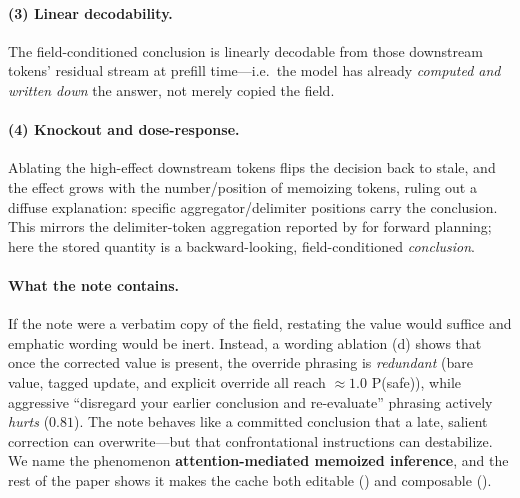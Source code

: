\paragraph{(3) Linear decodability.} The field-conditioned conclusion is linearly decodable from those
downstream tokens' residual stream at prefill time---i.e.\ the model has already \emph{computed and
written down} the answer, not merely copied the field.

\paragraph{(4) Knockout and dose-response.} Ablating the high-effect downstream tokens flips the decision
back to stale, and the effect grows with the number/position of memoizing tokens, ruling out a diffuse
explanation: specific aggregator/delimiter positions carry the conclusion. This mirrors the delimiter-token
aggregation reported by \citet{lindsey2025biology} for forward planning; here the stored quantity is a
backward-looking, field-conditioned \emph{conclusion}.

\paragraph{What the note contains.} If the note were a verbatim copy of the field, restating the value
would suffice and emphatic wording would be inert. Instead, a wording ablation (d) shows
that once the corrected value is present, the override phrasing is \emph{redundant} (bare value, tagged
update, and explicit override all reach $\approx 1.0$ P(safe)), while aggressive ``disregard your earlier
conclusion and re-evaluate'' phrasing actively \emph{hurts} ($0.81$). The note behaves like a committed
conclusion that a late, salient correction can overwrite---but that confrontational instructions can
destabilize. We name the phenomenon \textbf{attention-mediated memoized inference}, and the rest of the
paper shows it makes the cache both editable () and composable ().

